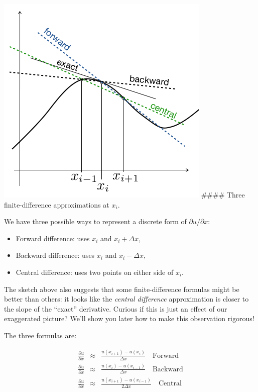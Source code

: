 \documentclass{article}
\providecommand{\tightlist}{%
      \setlength{\itemsep}{0pt}\setlength{\parskip}{0pt}}
\begin{document}
    \includegraphics{figures/FDapproxiamtions.png} \#\#\#\# Three
finite-difference approximations at \(x_i\).

    We have three possible ways to represent a discrete form of
\(\partial u/ \partial x\):

\begin{itemize}
\tightlist
\item
  Forward difference: uses \(x_i\) and \(x_i + \Delta x\),
\item
  Backward difference: uses \(x_i\) and \(x_i- \Delta x\),
\item
  Central difference: uses two points on either side of \(x_i\).
\end{itemize}

The sketch above also suggests that some finite-difference formulas
might be better than others: it looks like the \emph{central difference}
approximation is closer to the slope of the ``exact'' derivative.
Curious if this is just an effect of our exaggerated picture? We'll show
you later how to make this observation rigorous!

The three formulas are:

\begin{eqnarray}
\frac{\partial u}{\partial x} & \approx & \frac{u(x_{i+1})-u(x_i)}{\Delta x} \quad\text{Forward}\\
\frac{\partial u}{\partial x} & \approx & \frac{u(x_i)-u(x_{i-1})}{\Delta x} \quad\text{Backward}\\
\frac{\partial u}{\partial x} & \approx & \frac{u(x_{i+1})-u(x_{i-1})}{2\Delta x} \quad\text{Central}
\end{eqnarray}
\end{document}
